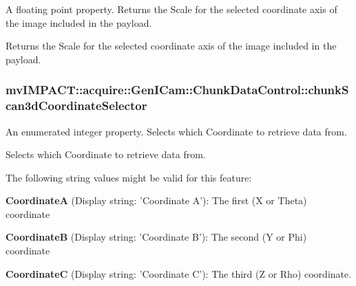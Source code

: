 A floating point property. Returns the Scale for the selected coordinate axis of the image included in the payload. 

Returns the Scale for the selected coordinate axis of the image included in the payload. \hypertarget{classmv_i_m_p_a_c_t_1_1acquire_1_1_gen_i_cam_1_1_chunk_data_control_abcd836abcc68145bec18c5b45e189324}{
\subsubsection[{chunk\+Scan3d\+Coordinate\+Selector}]{ mv\+I\+M\+P\+A\+C\+T\+::acquire\+::\+Gen\+I\+Cam\+::\+Chunk\+Data\+Control\+::chunk\+Scan3d\+Coordinate\+Selector}}\label{classmv_i_m_p_a_c_t_1_1acquire_1_1_gen_i_cam_1_1_chunk_data_control_abcd836abcc68145bec18c5b45e189324}


An enumerated integer property. Selects which Coordinate to retrieve data from. 

Selects which Coordinate to retrieve data from.

The following string values might be valid for this feature\+:
\begin{DoxyItemize}
\item {\bfseries Coordinate\+A} (Display string\+: 'Coordinate A')\+: The first (X or Theta) coordinate
\item {\bfseries Coordinate\+B} (Display string\+: 'Coordinate B')\+: The second (Y or Phi) coordinate
\item {\bfseries Coordinate\+C} (Display string\+: 'Coordinate C')\+: The third (Z or Rho) coordinate.
\end{DoxyItemize}

